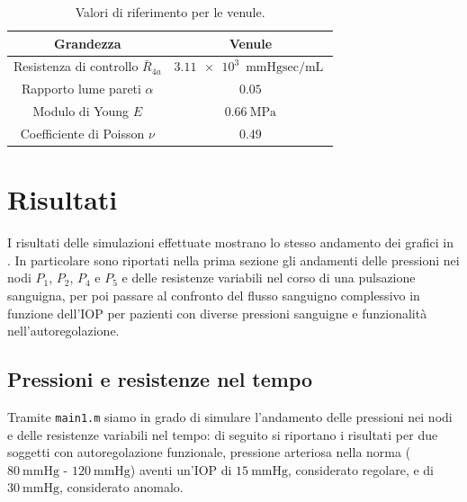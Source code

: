 \documentclass{article}
\begin{document}
\begin{table}[h!]
\begin{center}
\begin{tabular}{| c | c |}
\hline
\textbf{Grandezza} & \textbf{Venule}\\
\hline
Resistenza di controllo $\bar{R}_{4a}$ & $ \SI{3.11e3}{\mmHg \sec \per \milli \liter}$ \\
Rapporto lume pareti $\alpha$ & $0.05$\\
Modulo di Young $E$ & $\SI{0.66}{\mega\pascal}$\\
Coefficiente di Poisson $\nu$ & $0.49$\\
\hline
\end{tabular}
\caption{Valori di riferimento per le venule.}
\label{tab_ven}
\end{center}
\end{table}


\section{Risultati}
I risultati delle simulazioni effettuate mostrano lo stesso andamento dei grafici in \cite{art1}.
In particolare sono riportati nella prima sezione gli andamenti delle pressioni nei nodi $P_1$, $P_2$, $P_4$ e $P_5$ e delle resistenze variabili nel corso di una pulsazione sanguigna, per poi passare al confronto del flusso sanguigno complessivo in funzione dell'IOP per pazienti con diverse pressioni sanguigne e funzionalità nell'autoregolazione.

\subsection{Pressioni e resistenze nel tempo}
Tramite \texttt{main1.m} siamo in grado di simulare l'andamento delle pressioni nei nodi e delle resistenze variabili nel tempo: di seguito si riportano i risultati per due soggetti con autoregolazione funzionale, pressione arteriosa nella norma ($\SI{80}{\mmHg}$ - $\SI{120}{\mmHg}$) aventi un'IOP di $\SI{15}{\mmHg}$, considerato regolare, e di $\SI{30}{\mmHg}$, considerato anomalo.
\end{document}
